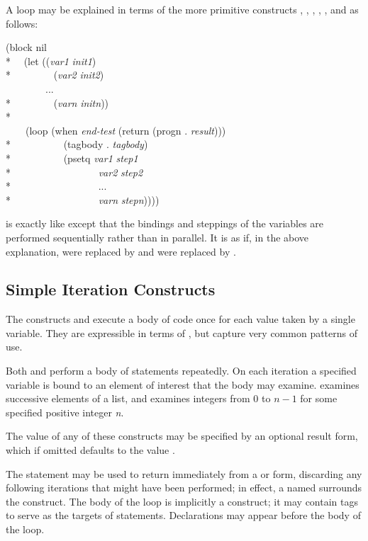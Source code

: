 \begin{defmac}
A  loop may be explained in terms of the more primitive constructs
, , , , ,
and  as follows:
\begin{lisp}
(block nil \\*
~~(let ((\textit{var1} \textit{init1}) \\*
~~~~~~~~(\textit{var2} \textit{init2}) \\
~~~~~~~~... \\*
~~~~~~~~(\textit{varn} \textit{initn})) \\*
~~~~ \\
~~~~(loop (when \textit{end-test} (return (progn . \textit{result}))) \\*
~~~~~~~~~~(tagbody . \textit{tagbody}) \\*
~~~~~~~~~~(psetq \textit{var1} \textit{step1} \\*
~~~~~~~~~~~~~~~~~\textit{var2} \textit{step2} \\*
~~~~~~~~~~~~~~~~~... \\*
~~~~~~~~~~~~~~~~~\textit{varn} \textit{stepn}))))
\end{lisp}
 is exactly like  except that the bindings and steppings
of the variables are performed sequentially rather than in parallel.
It is as if, in the above explanation,
 were replaced by  and  were replaced
by .
\end{defmac}

\subsection{Simple Iteration Constructs}

The constructs  and  execute a body of code
once for each value taken by a single variable.  They are expressible
in terms of , but capture very common patterns of use.

Both  and  perform
a body of statements repeatedly.  On each iteration a specified
variable is bound to an element of interest that the body may
examine.   examines successive elements of a list,
and  examines integers from 0 to $\textit{n}-1$
for some specified positive integer \textit{n}.

The value of any of these constructs may be specified by an optional result
form, which if omitted defaults to the value {\false}.

The  statement may be used to return
immediately from a  or  form,
discarding any following iterations
that might have been performed; in effect, a  named {\nil}
surrounds the construct.
The body of the loop is implicitly a  construct;
it may contain tags to serve as the targets of  statements.
Declarations may appear before the body of the loop.

